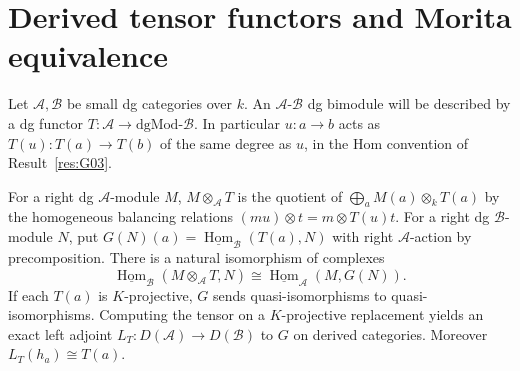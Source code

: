 \section{Derived tensor functors and Morita equivalence}

Let \(\mathcal A,\mathcal B\) be small dg categories over \(k\).
An \(\mathcal A\)-\(\mathcal B\) dg bimodule will be described by a
dg functor \(T:\mathcal A\to \mathrm{dgMod}\text{-}\mathcal B\).
In particular \(u:a\to b\) acts as \(T(u):T(a)\to T(b)\) of the
same degree as \(u\), in the Hom convention of Result~\ref{res:G03}.

\begin{proposition}\label{res:G13}
For a right dg \(\mathcal A\)-module \(M\), \(M\otimes_\mathcal A T\)
is the quotient of \(\bigoplus_a M(a)\otimes_k T(a)\) by the
homogeneous balancing relations
\((m u)\otimes t=m\otimes T(u)t\).
For a right dg \(\mathcal B\)-module \(N\), put
\(G(N)(a)=\underline{\operatorname{Hom}}_\mathcal B(T(a),N)\)
with right \(\mathcal A\)-action by precomposition. There is a
natural isomorphism of complexes
\[
 \underline{\operatorname{Hom}}_\mathcal B(M\otimes_\mathcal A T,N)
    \cong \underline{\operatorname{Hom}}_\mathcal A(M,G(N)).
\]
If each \(T(a)\) is \(K\)-projective, \(G\) sends quasi-isomorphisms
to quasi-isomorphisms. Computing the tensor on a \(K\)-projective
replacement yields an exact left adjoint
\(L_T:D(\mathcal A)\to D(\mathcal B)\) to \(G\) on derived categories.
Moreover \(L_T(h_a)\cong T(a)\).
\end{proposition}

